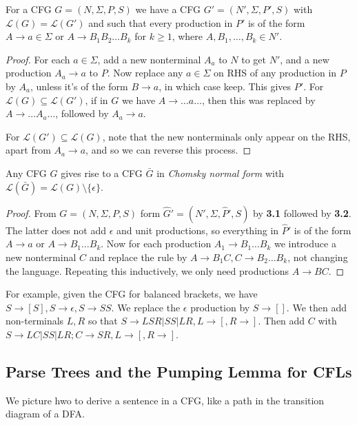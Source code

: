 \documentclass[10pt,a4paper]{article}
\begin{document}
\begin{lemma}
For a CFG $G = (N, \Sigma, P, S)$ we have a CFG $G' = (N', \Sigma, P', S)$ with $\mathcal{L}(G) = \mathcal{L}(G')$ and such that every production in $P'$ is of the form $A \to a \in \Sigma$ or $A \to B_1 B_2 \ldots B_k$ for $k \geq 1$, where $A, B_1, \ldots, B_k \in N'$.
\end{lemma}
\begin{proof}
For each $a \in \Sigma$, add a new nonterminal $A_a$ to $N$ to get $N'$, and a new production $A_a \to a$ to $P$. Now replace any $a \in \Sigma$ on RHS of any production in $P$ by $A_a$, unless it's of the form $B \to a$, in which case keep. This gives $P'$. For $\mathcal{L}(G) \subseteq \mathcal{L}(G')$, if in $G$ we have $A \to \ldots a \ldots$, then this was replaced by $A \to \ldots A_a \ldots$, followed by $A_a \to a$. 

For $\mathcal{L}(G') \subseteq \mathcal{L}(G)$, note that the new nonterminals only appear on the RHS, apart from $A_a \to a$, and so we can reverse this process.
\end{proof}

\begin{theorem}
Any CFG $G$ gives rise to a CFG $\bar{G}$ in \emph{Chomsky normal form} with $\mathcal{L}(\bar{G}) = \mathcal{L}(G)\setminus\{\epsilon\}$.
\end{theorem}
\begin{proof}
From $G = (N, \Sigma, P, S)$ form $\hat{G}' = (N', \Sigma, \hat{P}', S)$ by \textbf{3.1} followed by \textbf{3.2}. The latter does not add $\epsilon$ and unit productions, so everything in $\hat{P}'$ is of the form $A \to a$ or $A \to B_1\ldots B_k$. Now for each production $A_1 \to B_1\ldots B_k$ we introduce a new nonterminal $C$ and replace the rule by $A \to B_1 C, C \to B_2 \ldots B_k$, not changing the language. Repeating this inductively, we only need productions $A \to BC$.
\end{proof} 

For example, given the CFG for balanced brackets, we have $S \to [S], S \to \epsilon, S \to SS$. We replace the $\epsilon$ production by $S \to []$. We then add non-terminals $L,R$ so that $S \to LSR|SS|LR, L \to [, R \to ]$. Then add $C$ with $S \to LC|SS|LR; C\to SR, L \to [, R\to ]$.

\subsection*{Parse Trees and the Pumping Lemma for CFLs}
We picture hwo to derive a sentence in a CFG, like a path in the transition diagram of a DFA.
\end{document}
